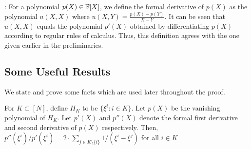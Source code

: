 : For a polynomial $p(X) \in \mathbb{F}[X]$, we define the formal derivative of $p(X)$ as the polynomial
$u(X,X)$ where $u(X,Y)=\frac{p(X)-p(Y)}{X-Y}$. It can be seen that $u(X,X)$ equals the polynomial $p'(X)$ obtained by differentiating
$p(X)$ according to regular rules of calculus. Thus, this definition agrees with the one given earlier in the preliminaries.

\subsection{Some Useful Results}\label{subsec:sub-results}
We state and prove some facts which are used later throughout the proof.

\begin{lemma}\label{lem:sumtoder}
For $K\subset [N]$, define $H_K$ to be $\{\xi^i:i \in K\}$. Let $p(X)$ be the vanishing polynomial of $H_{K}$.
Let $p'(X)$ and $p''(X)$ denote the formal first derivative and second derivative of $p(X)$ respectively.
Then, $p''(\xi^i)/p'(\xi^i)=2 \cdot \sum_{j\in K\setminus \{i\}} 1/(\xi^i-\xi^j)$ for all $i \in K$
\end{lemma}

